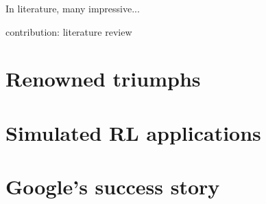 In literature, many impressive...


contribution: literature review

\section{Renowned triumphs}

\section{Simulated RL applications}

\section{Google's success story}
